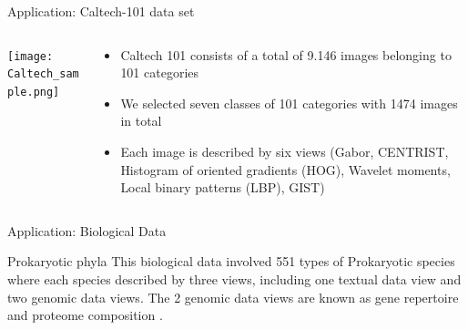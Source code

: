 \documentclass[compress,sky blue]{beamer}
\begin{document}
\begin{frame}{Application: Caltech-101 data set }

\begin{columns}
  \begin{column}{0.3\textwidth}
    \begin{center}
     \texttt{[image: Caltech\_sample.png]}
     \end{center}
  \end{column}
  \begin{column}{0.7\textwidth}  %
    \begin{itemize}
	  \item Caltech 101 consists of a total of \alert{9.146} images belonging to \alert{101} categories \cite{Fei-Fei2007LearningCategories}
	  \item We selected \alert{seven} classes of 101 categories with \alert{1474} images in total
\item Each image is described by \alert{six} views (Gabor, CENTRIST, Histogram of oriented gradients (HOG), Wavelet moments, Local binary patterns (LBP), GIST)
	\end{itemize}
  \end{column}
\end{columns}

\end{frame}

\begin{frame}{Application: Biological Data }

\begin{exampleblock}{Prokaryotic phyla }
 This biological data involved \alert{551} types of Prokaryotic species where each species described by \alert{three} views, including one textual data view and two genomic data views. The 2 genomic data views are known as gene repertoire and proteome composition \cite{Brbic2016TheGenes}. 
\end{exampleblock}


\end{frame}
\end{document}
